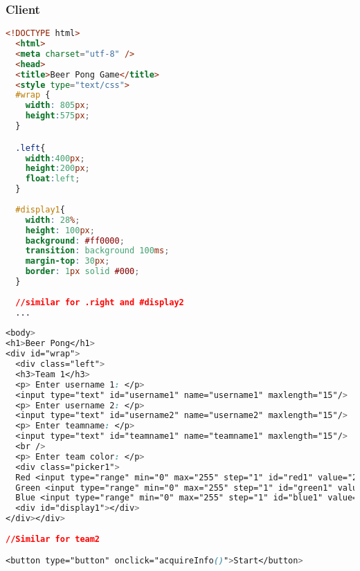\documentclass[Softwaredesign/Softwaredesign_main.tex]{subfiles}
\begin{document}
\subsubsection{Client}
\begin{lstlisting}[language=HTML, caption={WebPage interface layout}, label=list:webpage_interface]
<!DOCTYPE html>
  <html>
  <meta charset="utf-8" />
  <head>
  <title>Beer Pong Game</title>
  <style type="text/css">
  #wrap {
    width: 805px;
    height:575px;
  }

  .left{
    width:400px;
    height:200px;
    float:left;
  }
  
  #display1{
    width: 28%;
    height: 100px;
    background: #ff0000;
    transition: background 100ms;
    margin-top: 30px;
    border: 1px solid #000;
  }
  
  //similar for .right and #display2
  ...
  
<body>
<h1>Beer Pong</h1>
<div id="wrap">
  <div class="left">
  <h3>Team 1</h3>
  <p> Enter username 1: </p>
  <input type="text" id="username1" name="username1" maxlength="15"/>
  <p> Enter username 2: </p>
  <input type="text" id="username2" name="username2" maxlength="15"/>
  <p> Enter teamname: </p>
  <input type="text" id="teamname1" name="teamname1" maxlength="15"/>
  <br />
  <p> Enter team color: </p>
  <div class="picker1">
  Red <input type="range" min="0" max="255" step="1" id="red1" value="255">
  Green <input type="range" min="0" max="255" step="1" id="green1" value="0">
  Blue <input type="range" min="0" max="255" step="1" id="blue1" value="0">
  <div id="display1"></div>
</div></div>
 
//Similar for team2 

<button type="button" onclick="acquireInfo()">Start</button>
\end{lstlisting}
\end{document}
